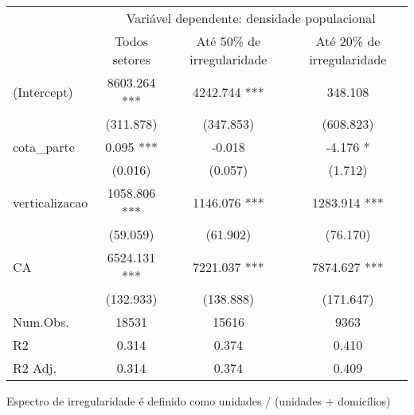 \setlength{\LTpost}{0mm}
\begin{longtable}{lccc}
\toprule
 & \multicolumn{3}{c}{Variável dependente: densidade populacional} \\ 
\cmidrule(lr){2-4}
  & Todos setores & Até 50\% de irregularidade & Até 20\% de irregularidade \\ 
\midrule\addlinespace[2.5pt]
(Intercept) & 8603.264 *** & 4242.744 *** & 348.108 \\ 
 & (311.878) & (347.853) & (608.823) \\ 
cota\_parte & 0.095 *** & -0.018 & -4.176 * \\ 
 & (0.016) & (0.057) & (1.712) \\ 
verticalizacao & 1058.806 *** & 1146.076 *** & 1283.914 *** \\ 
 & (59.059) & (61.902) & (76.170) \\ 
CA & 6524.131 *** & 7221.037 *** & 7874.627 *** \\ 
 & (132.933) & (138.888) & (171.647) \\ 
Num.Obs. & 18531 & 15616 & 9363 \\ 
R2 & 0.314 & 0.374 & 0.410 \\ 
R2 Adj. & 0.314 & 0.374 & 0.409 \\ 
\bottomrule
\end{longtable}
\begin{minipage}{\linewidth}
Espectro de irregularidade é definido como unidades / (unidades + domicílios)\\
\end{minipage}

